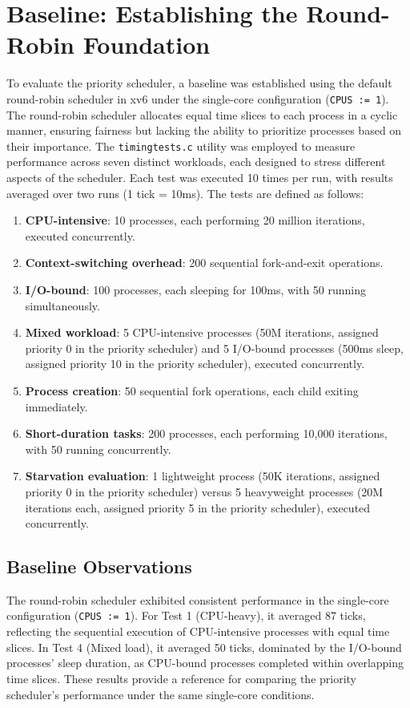 \documentclass{article}
\begin{document}
\section{Baseline: Establishing the Round-Robin Foundation}
To evaluate the priority scheduler, a baseline was established using the default round-robin scheduler in xv6 under the single-core configuration (\texttt{CPUS := 1}). The round-robin scheduler allocates equal time slices to each process in a cyclic manner, ensuring fairness but lacking the ability to prioritize processes based on their importance. The \texttt{timingtests.c} utility was employed to measure performance across seven distinct workloads, each designed to stress different aspects of the scheduler. Each test was executed 10 times per run, with results averaged over two runs (1 tick = 10ms). The tests are defined as follows:
\begin{enumerate}[label=\arabic*.]
    \item \textbf{CPU-intensive}: 10 processes, each performing 20 million iterations, executed concurrently.
    \item \textbf{Context-switching overhead}: 200 sequential fork-and-exit operations.
    \item \textbf{I/O-bound}: 100 processes, each sleeping for 100ms, with 50 running simultaneously.
    \item \textbf{Mixed workload}: 5 CPU-intensive processes (50M iterations, assigned priority 0 in the priority scheduler) and 5 I/O-bound processes (500ms sleep, assigned priority 10 in the priority scheduler), executed concurrently.
    \item \textbf{Process creation}: 50 sequential fork operations, each child exiting immediately.
    \item \textbf{Short-duration tasks}: 200 processes, each performing 10,000 iterations, with 50 running concurrently.
    \item \textbf{Starvation evaluation}: 1 lightweight process (50K iterations, assigned priority 0 in the priority scheduler) versus 5 heavyweight processes (20M iterations each, assigned priority 5 in the priority scheduler), executed concurrently.
\end{enumerate}

\subsection{Baseline Observations}
The round-robin scheduler exhibited consistent performance in the single-core configuration (\texttt{CPUS := 1}). For Test 1 (CPU-heavy), it averaged 87 ticks, reflecting the sequential execution of CPU-intensive processes with equal time slices. In Test 4 (Mixed load), it averaged 50 ticks, dominated by the I/O-bound processes’ sleep duration, as CPU-bound processes completed within overlapping time slices. These results provide a reference for comparing the priority scheduler’s performance under the same single-core conditions.
\end{document}
